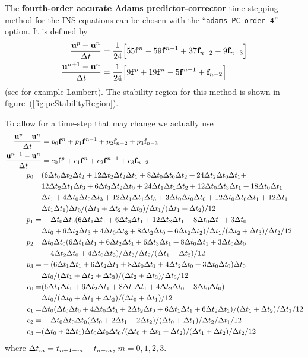 The {\bf fourth-order accurate Adams predictor-corrector} time stepping method for the INS equations can be chosen
with the ``{\tt adams PC order 4}'' option. 
It is defined by 
\begin{align*}
 { \uv^p - \uv^n \over \dt } &= {1\over 24}\Big[ 55 \fv^n -59\fv^{n-1} +37\fv_{n-2}-9\fv_{n-3}\Big] \\
 { \uv^{n+1} - \uv^n \over \dt } &= {1\over 24}\Big[ 9\fv^p + 19\fv^n -5\fv^{n-1} +\fv_{n-2}\Big]
\end{align*}
(see for example Lambert\cite{Lambert73}).
The stability region for this method is shown in figure~(\ref{fig:pcStabilityRegion}).

To allow for a time-step that may change we actually use
\begin{align*}
 { \uv^p - \uv^n \over \dt } &=  p_0 \fv^n +p_1 \fv^{n-1} + p_2\fv_{n-2} +p_3 \fv_{n-3} \\
 { \uv^{n+1} - \uv^n \over \dt } &= c_0 \fv^p + c_1\fv^n +c_2\fv^{n-1} + c_3\fv_{n-2}  \\
 p_0 =& (6 \dt_0 \dt_2 \dt_2+12 \dt_2 \dt_2 \dt_1+8 \dt_0 \dt_0 \dt_2+24 \dt_2 \dt_0 \dt_1+ \\
      &   12 \dt_2 \dt_1 \dt_3+6 \dt_3 \dt_2 \dt_0+24 \dt_1 \dt_1 \dt_2+12 \dt_0 \dt_3 \dt_1+18 \dt_0 \dt_1 \\
      &	\dt_1+4 \dt_0 \dt_0 \dt_3+12 \dt_1 \dt_1 \dt_3+3 \dt_0 \dt_0 \dt_0+12 \dt_0 \dt_0 \dt_1+12 \dt_1\\
	      &        \dt_1 \dt_1) \dt_0/(\dt_1+\dt_2+\dt_3)/\dt_1/(\dt_1+\dt_2)/12  \\
 p_1 =& -\dt_0 \dt_0 (6 \dt_1 \dt_1+6 \dt_3 \dt_1+12 \dt_2 \dt_1+8 \dt_0 \dt_1+3 \dt_0 \\
      &	\dt_0+6 \dt_2 \dt_3+4 \dt_0 \dt_3+8 \dt_2 \dt_0+6 \dt_2 \dt_2)/\dt_1/(\dt_2+\dt_3)/\dt_2/12  \\
 p_2 =& \dt_0 \dt_0 (6 \dt_1 \dt_1+6 \dt_2 \dt_1+6 \dt_3 \dt_1+8 \dt_0 \dt_1+3 \dt_0 \dt_0 \\
      &		       +4 \dt_2 \dt_0+4 \dt_0 \dt_3)/\dt_3/\dt_2/(\dt_1+\dt_2)/12  \\
 p_3 =& -(6 \dt_1 \dt_1+6 \dt_2 \dt_1+8 \dt_0 \dt_1+4 \dt_2 \dt_0+3 \dt_0 \dt_0) \dt_0 \\
      &                        \dt_0/(\dt_1+\dt_2+\dt_3)/(\dt_2+\dt_3)/\dt_3/12  \\
 c_0 =& (6 \dt_1 \dt_1+6 \dt_2 \dt_1+8 \dt_0 \dt_1+4 \dt_2 \dt_0+3 \dt_0 \dt_0) \\
      &  \dt_0/(\dt_0+\dt_1+\dt_2)/(\dt_0+\dt_1)/12  \\
 c_1 =&  \dt_0 (\dt_0 \dt_0+4 \dt_0 \dt_1+2 \dt_2 \dt_0+6 \dt_1 \dt_1+6 \dt_2 \dt_1)/(\dt_1+\dt_2)/\dt_1/12  \\
 c_2 =&  -\dt_0 \dt_0 \dt_0 (\dt_0+2 \dt_1+2 \dt_2)/(\dt_0+\dt_1)/\dt_2/\dt_1/12  \\
 c_3 =&  (\dt_0+2 \dt_1) \dt_0 \dt_0 \dt_0/(\dt_0+\dt_1+\dt_2)/(\dt_1+\dt_2)/\dt_2/12 
\end{align*}
where $\dt_m=t_{n+1-m}-t_{n-m}$, $m=0,1,2,3$.

